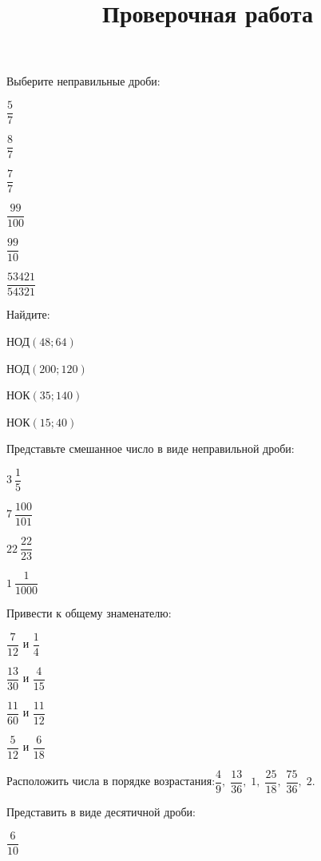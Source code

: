 \newpage
\title{Проверочная работа}
\begin{listofex}
	\item Выберите неправильные дроби:
	\begin{enumcols}[itemcolumns=6]
		\item \( \dfrac{5}{7} \)
		\item \( \dfrac{8}{7} \)
		\item \( \dfrac{7}{7} \)
		\item \( \dfrac{99}{100} \)
		\item \( \dfrac{99}{10} \)
		\item \( \dfrac{53421}{54321} \)
	\end{enumcols}
	\item Найдите:
	\begin{enumcols}[itemcolumns=4]
		\item НОД\( (48; 64) \)
		\item НОД\( (200; 120) \)
		\item НОК\( (35; 140) \)
		\item НОК\( (15; 40) \)
	\end{enumcols}
	\item Представьте смешанное число в виде неправильной дроби:
	\begin{enumcols}[itemcolumns=4]
		\item \( 3\:\dfrac{1}{5} \)
		\item \( 7\:\dfrac{100}{101} \)
		\item \( 22\:\dfrac{22}{23} \)
		\item \( 1\:\dfrac{1}{1000} \)
	\end{enumcols}
	\item Привести к общему знаменателю:
	\begin{enumcols}[itemcolumns=4]
		\item \( \dfrac{7}{12} \) и \( \dfrac{1}{4} \)
		\item \( \dfrac{13}{30} \) и \( \dfrac{4}{15} \)
		\item \( \dfrac{11}{60} \) и \( \dfrac{11}{12} \)
		\item \( \dfrac{5}{12} \) и \( \dfrac{6}{18} \)
	\end{enumcols}
	\item Расположить числа в порядке возрастания:\quad\( \dfrac{4}{9},\;\dfrac{13}{36},\;1,\;\dfrac{25}{18},\;\dfrac{75}{36},\;2 \).
	\item Представить в виде десятичной дроби:
	\begin{enumcols}[itemcolumns=4]
		\item \( \dfrac{6}{10} \)

\end{enumcols}
\end{listofex}
